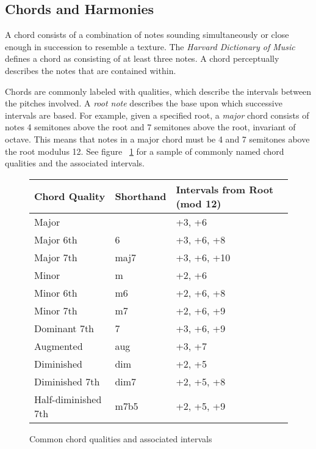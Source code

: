 \subsection{Chords and Harmonies}

A chord consists of a combination of notes sounding simultaneously or close enough in succession to resemble a texture. The \textit{Harvard Dictionary of Music} defines a chord as consisting of at least three notes\cite{harvdict}. A chord perceptually describes the notes that are contained within.

Chords are commonly labeled with qualities, which describe the intervals between the pitches involved. A \textit{root note} describes the base upon which successive intervals are based. For example, given a specified root, a \textit{major} chord consists of notes 4 semitones above the root and 7 semitones above the root, invariant of octave. This means that notes in a major chord must be 4 and 7 semitones above the root modulus 12. See figure ~\ref{fig:qualitytable} for a sample of commonly named chord qualities and the associated intervals.

\begin{figure}[h!]
\begin{center}
\begin{tabular}{lll}
\toprule
Chord Quality       & Shorthand & Intervals from Root (mod 12) \\
\midrule
Major               &           & +3, +6     \\
Major 6th           & 6         & +3, +6, +8 \\
Major 7th           & maj7      & +3, +6, +10\\
Minor               & m         & +2, +6     \\
Minor 6th           & m6        & +2, +6, +8 \\
Minor 7th           & m7        & +2, +6, +9 \\
Dominant 7th        & 7         & +3, +6, +9 \\
Augmented           & aug       & +3, +7     \\
Diminished          & dim       & +2, +5     \\
Diminished 7th      & dim7      & +2, +5, +8 \\
Half-diminished 7th & m7b5      & +2, +5, +9 \\
\bottomrule
\end{tabular}
\caption{Common chord qualities and associated intervals}
\label{fig:qualitytable}
\end{center}
\end{figure}

